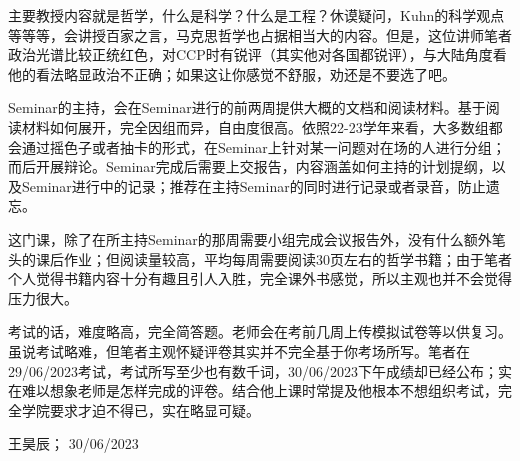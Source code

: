 主要教授内容就是哲学，什么是科学？什么是工程？休谟疑问，Kuhn的科学观点等等等，会讲授百家之言，马克思哲学也占据相当大的内容。但是，这位讲师笔者政治光谱比较正统红色，对CCP时有锐评（其实他对各国都锐评），与大陆角度看他的看法略显政治不正确；如果这让你感觉不舒服，劝还是不要选了吧。

Seminar的主持，会在Seminar进行的前两周提供大概的文档和阅读材料。基于阅读材料如何展开，完全因组而异，自由度很高。依照22-23学年来看，大多数组都会通过摇色子或者抽卡的形式，在Seminar上针对某一问题对在场的人进行分组；而后开展辩论。Seminar完成后需要上交报告，内容涵盖如何主持的计划提纲，以及Seminar进行中的记录；推荐在主持Seminar的同时进行记录或者录音，防止遗忘。

这门课，除了在所主持Seminar的那周需要小组完成会议报告外，没有什么额外笔头的课后作业；但阅读量较高，平均每周需要阅读30页左右的哲学书籍；由于笔者个人觉得书籍内容十分有趣且引人入胜，完全课外书感觉，所以主观也并不会觉得压力很大。

考试的话，难度略高，完全简答题。老师会在考前几周上传模拟试卷等以供复习。虽说考试略难，但笔者主观怀疑评卷其实并不完全基于你考场所写。笔者在29/06/2023考试，考试所写至少也有数千词，30/06/2023下午成绩却已经公布；实在难以想象老师是怎样完成的评卷。结合他上课时常提及他根本不想组织考试，完全学院要求才迫不得已，实在略显可疑。
\begin{flushright}
王昊辰； 30/06/2023
\end{flushright}

